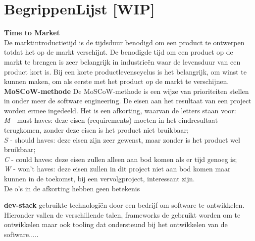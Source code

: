 
\chapter{BegrippenLijst [WIP]}


\textbf{Time to Market}\\
De marktintroductietijd is de tijdsduur benodigd om een product te ontwerpen totdat het op de markt verschijnt. De benodigde tijd om een product op de markt te brengen is zeer belangrijk in industrieën waar de levensduur van een product kort is. Bij een korte productlevenscyclus is het belangrijk, om winst te kunnen maken, om als eerste met het product op de markt te verschijnen.\\

\textbf{MoSCoW-methode}
De MoSCoW-methode is een wijze van prioriteiten stellen in onder meer de software engineering. De eisen aan het resultaat van een project worden ermee ingedeeld. Het is een afkorting, waarvan de letters staan voor:\\
\textit{M} - must haves: deze eisen (requirements) moeten in het eindresultaat terugkomen, zonder deze eisen is het product niet bruikbaar;\\
\textit{S} - should haves: deze eisen zijn zeer gewenst, maar zonder is het product wel bruikbaar;\\
\textit{C} - could haves: deze eisen zullen alleen aan bod komen als er tijd genoeg is;\\
\textit{W} - won't haves: deze eisen zullen in dit project niet aan bod komen maar kunnen in de toekomst, bij een vervolgproject, interessant zijn.\\
De o's in de afkorting hebben geen betekenis

\textbf{dev-stack}
gebruikte technologi\"en door een bedrijf om software te ontwikkelen. Hieronder vallen de verschillende talen, frameworks de gebruikt worden om te ontwikkelen maar ook tooling dat ondersteund bij het ontwikkelen van de software.....
